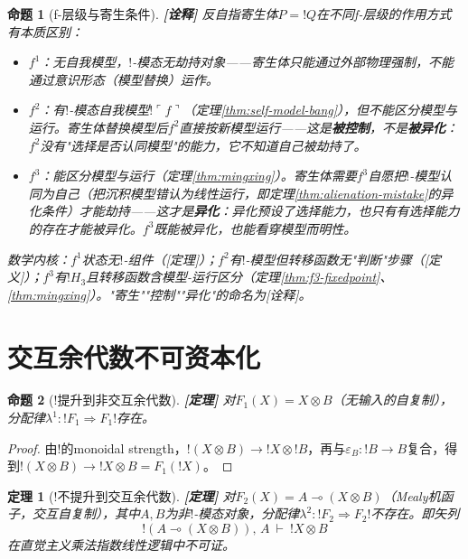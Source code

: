 \documentclass[11pt,a4paper]{article}
\newtheorem{theorem}{定理}
\newtheorem{proposition}{命题}
\newcommand{\lvl}[1]{\hfill\textbf{\footnotesize[#1]}}
\newcommand{\lvP}{\lvl{定理}}
\newcommand{\lvI}{\lvl{诠释}}
\newcommand{\lolli}{\multimap}
\newcommand{\bang}{{!}}
\newcommand{\tensor}{\otimes}
\newcommand{\eps}{\varepsilon}
\begin{document}
\begin{proposition}[f-层级与寄生条件]\label{prop:f3-alienation}\lvI
反自指寄生体$P=\bang Q$在不同f-层级的作用方式有本质区别：
\begin{itemize}
  \item $f^1$：无自我模型，$\bang$-模态无劫持对象——寄生体只能通过外部物理强制，不能通过意识形态（模型替换）运作。
  \item $f^2$：有$\bang$-模态自我模型$\bang\ulcorner f\urcorner$（定理\ref{thm:self-model-bang}），但不能区分模型与运行。寄生体替换模型后$f^2$直接按新模型运行——这是\textbf{被控制}，不是\textbf{被异化}：$f^2$没有"选择是否认同模型"的能力，它不知道自己被劫持了。
  \item $f^3$：能区分模型与运行（定理\ref{thm:mingxing}）。寄生体需要$f^3$\emph{自愿}把$\bang$-模型认同为自己（把沉积模型错认为线性运行，即定理\ref{thm:alienation-mistake}的异化条件）才能劫持——这才是\textbf{异化}：异化预设了选择能力，也只有有选择能力的存在才能被异化。$f^3$既能被异化，也能看穿模型而明性。
\end{itemize}

数学内核：$f^1$状态无$\bang$-组件（[定理]）；$f^2$有$\bang$-模型但转移函数无"判断"步骤（[定义]）；$f^3$有$\bang H_3$且转移函数含模型-运行区分（定理\ref{thm:f3-fixedpoint}、\ref{thm:mingxing}）。"寄生""控制""异化"的命名为[诠释]。
\end{proposition}

\section{交互余代数不可资本化}

\begin{proposition}[$\bang$提升到非交互余代数]\label{prop:lift-noninteractive}\lvP
对$F_1(X)=X\tensor B$（无输入的自复制），分配律$\lambda^1:\bang F_1\Rightarrow F_1\bang$存在。
\end{proposition}
\begin{proof}
由$\bang$的monoidal strength，$\bang(X\tensor B)\to\bang X\tensor\bang B$，再与$\eps_B:\bang B\to B$复合，得到$\bang(X\tensor B)\to\bang X\tensor B=F_1(\bang X)$。
\end{proof}

\begin{theorem}[$\bang$不提升到交互余代数]\label{thm:no-lift-interactive}\lvP
对$F_2(X)=A\lolli(X\tensor B)$（Mealy机函子，交互自复制），其中$A,B$为非$\bang$-模态对象，分配律$\lambda^2:\bang F_2\Rightarrow F_2\bang$不存在。即矢列
$$\bang(A\lolli(X\tensor B)),\, A\ \vdash\ \bang X\tensor B$$
在直觉主义乘法指数线性逻辑中不可证。
\end{theorem}
\end{document}
